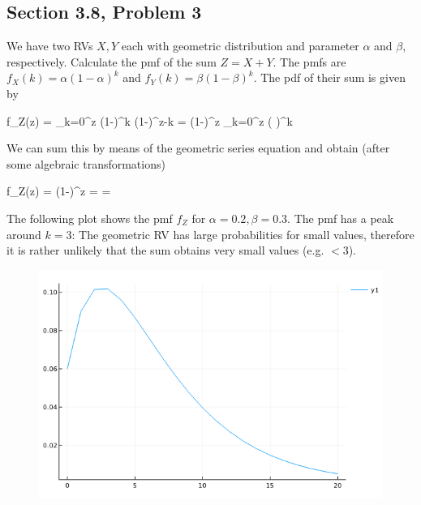 
\subsection{Section 3.8, Problem 3}

We have two RVs $X, Y$ each with geometric distribution and parameter $\alpha$ and $\beta$, respectively. Calculate the pmf of the sum $Z = X+Y$. The pmfs are $f_X(k) = \alpha(1-\alpha)^k$ and $f_Y(k) = \beta(1-\beta)^k$. The pdf of their sum is given by

\bee
f_Z(z) = \sum_{k=0}^z \alpha (1-\alpha)^k \beta (1-\beta)^{z-k} = \alpha \beta (1-\beta)^z \sum_{k=0}^z \left( \right)^k
\eee

We can sum this by means of the geometric series equation and obtain (after some algebraic transformations)

\bee
f_Z(z) = \alpha \beta (1-\beta)^z  = \cdots = \frac{\alpha \beta}{\alpha-\beta} 
\eee

The following plot shows the pmf $f_Z$ for $\alpha=0.2, \beta=0.3$. The pmf has a peak around $k=3$: The geometric RV has large probabilities for small values, therefore it is rather unlikely that the sum obtains very small values (e.g. $< 3$).

\begin{figure}[H]
  \includegraphics[scale=0.6]{images/1000_problems_in_prob_3_1.png}
\end{figure}


